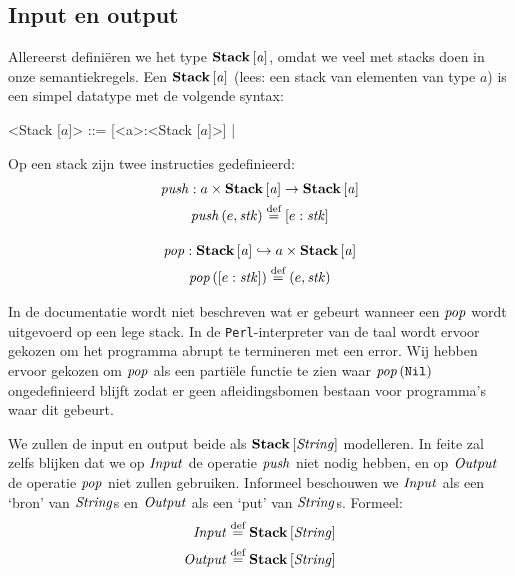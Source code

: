 \subsection{Input en output}
\label{sec:def:io}

Allereerst definiëren we het type $\mathbf{Stack}\left[\mathit{a}\right]$, omdat we veel met stacks
doen in onze semantiekregels. Een $\mathbf{Stack}\left[\mathit{a}\right]$ (lees: een stack van elementen
van type $a$) is een simpel datatype met de volgende syntax:

\def\inbrackets#1{$\mathrm{[}#1\mathrm{]}$}
\def\bracka{\inbrackets{a}}
\begin{grammar}
	<Stack \bracka> ::= [<a>:<Stack \bracka>] | \Nil
\end{grammar}

Op een stack zijn twee instructies gedefinieerd:
\begin{gather*}
	\mathit{push} : a \times \mathbf{Stack}\left[\mathit{a}\right] \to \mathbf{Stack}\left[\mathit{a}\right] \\
	\mathit{push}\left(e, \mathit{stk}\right) \stackrel{\text{def}}{=} [e:\mathit{stk}] \\[1em]
	\mathit{pop} : \mathbf{Stack}\left[\mathit{a}\right] \hookrightarrow a \times \mathbf{Stack}\left[\mathit{a}\right] \\
	\mathit{pop}\left([e:\mathit{stk}]\right) \stackrel{\text{def}}{=} (e,\mathit{stk}) \\
\end{gather*}

In de documentatie \cite{safalra} wordt niet beschreven wat er gebeurt wanneer een $\mathit{pop}$ wordt uitgevoerd op een lege stack. In de \texttt{Perl}-interpreter van de taal wordt ervoor gekozen om het programma abrupt te termineren met een error. Wij hebben ervoor gekozen om $\mathit{pop}$ als een partiële functie te zien waar $\mathit{pop}\left(\texttt{Nil}\right)$ ongedefinieerd blijft zodat er geen afleidingsbomen bestaan voor programma's waar dit gebeurt.


\medskip
We zullen de input en output beide als $\mathbf{Stack}\left[\mathit{\mathit{String}}\right]$ modelleren. In feite
zal zelfs blijken dat we op $\mathit{Input}$ de operatie $\mathit{push}$ niet nodig hebben,
en op $\mathit{Output}$ de operatie $\mathit{pop}$ niet zullen gebruiken. Informeel
beschouwen we $\mathit{Input}$ als een `bron' van $\mathit{String}$s en $\mathit{Output}$ als een `put'
van $\mathit{String}$s. Formeel:
\begin{align*}
	\mathit{Input} &\stackrel{\text{def}}{=} \mathbf{Stack}\left[\mathit{\mathit{String}}\right] \\ \mathit{Output} &\stackrel{\text{def}}{=} \mathbf{Stack}\left[\mathit{\mathit{String}}\right]
\end{align*}

